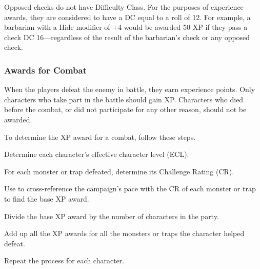 Opposed checks do not have Difficulty Class. For the purposes of experience awards, they are considered to have a DC equal to a roll of 12. For example, a barbarian with a Hide modifier of +4 would be awarded 50 XP if they pass a  check DC 16---regardless of the result of the barbarian's  check or any opposed  check.


\subsubsection{Awards for Combat}
When the players defeat the enemy in battle, they earn experience points. Only characters who take part in the battle should gain XP. Characters who died before the combat, or did not participate for any other reason, should not be awarded.

To determine the XP award for a combat, follow these steps.
\begin{enumerate*}
	\item Determine each character's effective character level (ECL).
	\item For each monster or trap defeated, determine its Challenge Rating (CR).
	\item Use  to cross-reference the campaign's pace with the CR of each monster or trap to find the base XP award.
	\item Divide the base XP award by the number of characters in the party.
	\item Add up all the XP awards for all the monsters or traps the character helped defeat.
	\item Repeat the process for each character.
\end{enumerate*}

